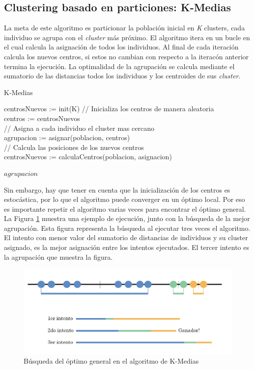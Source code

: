 	\subsection{Clustering basado en particiones: K-Medias}

		La meta de este algoritmo es particionar la población inicial en \textit{K} clusters, cada individuo se agrupa con el \textit{cluster} más próximo. El algoritmo itera en un bucle en el cual calcula la asignación de todos los individuos. Al final de cada iteración calcula los nuevos centros, si estos no cambian con respecto a la iteracón anterior termina la ejecución. La optimalidad de la agrupación se calcula mediante el sumatorio de las distancias todos los individuos y los centroides de sus \textit{cluster}. 
		
		
		\begin{algorithm}[!h]
			\caption{K-Medias}
			centrosNuevos := init(K) // Inicializa los centros de manera aleatoria\\
			
			{
				centros := centrosNuevos\\
				// Asigna a cada individuo el cluster mas cercano\\
				agrupacion := asignar(poblacion, centros)\\
				// Calcula las posiciones de los nuevos centros\\
				centrosNuevos := calculaCentros(poblacion, asignacion)
			}
			
			
			\Return $agrupacion$\;
		\end{algorithm}
		
		Sin embargo, hay que tener en cuenta que la inicialización de los centros es estocástica, por lo que el algoritmo puede converger en un óptimo local. Por eso es importante repetir el algoritmo varias veces para encontrar el óptimo general. La Figura \ref{fig:kmediasBusqueda} muestra una ejemplo de ejecución, junto con la búsqueda de la mejor agrupación. Esta figura representa la búsqueda al ejecutar tres veces el algoritmo. El intento con menor valor del sumatorio de distancias de individuos y su cluster asignado, es la mejor asignación entre los intentos ejecutados. El tercer intento es la agrupación que muestra la figura.


		\begin{figure}[!h]
			\centering
			\includegraphics[width=1\textwidth]{images/chapter_2/kmedias}
			\caption{Búsqueda del óptimo general en el algoritmo de K-Medias}
			\label{fig:kmediasBusqueda}
		\end{figure}


